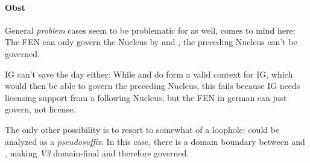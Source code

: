 
\paragraph{Obst}
General \emph{problem} cases seem to be problematic for
\CVCV as well,  %
comes to mind here:
The \gls{FEN} can only govern the Nucleus  by
\ti{[s]} and \ti{[t]}, the preceding Nucleus can't be governed.

\begin{structure}
  \wordstart
  \emptyV
  \emptyV
  \fen
\end{structure}

\gls{IG} can't save the day either:
While \ti{[s]} and \ti{[t]} do form a valid context for \gls{IG},
which would then be able to govern the preceding Nucleus,
this fails because \gls{IG} needs licensing support from a following
Nucleus, but the \gls{FEN} in german can just govern, not license.

The only other possibility is to resort to somewhat of a loophole:
\ti{[st]} could be analyzed as a \emph{pseudosuffix}.
In this case, there is a domain boundary between \ti{[p]}
and \ti{[s]}, making \emph{V3} %
domain-final and therefore governed.
